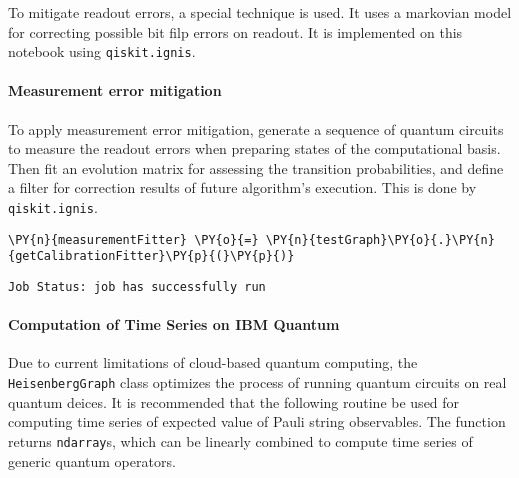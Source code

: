 To mitigate readout errors, a special technique is used. It uses a
markovian model for correcting possible bit filp errors on readout. It
is implemented on this notebook using \texttt{qiskit.ignis}.

    \hypertarget{measurement-error-mitigation}{%
\paragraph{Measurement error
mitigation}\label{measurement-error-mitigation}}

To apply measurement error mitigation, generate a sequence of quantum
circuits to measure the readout errors when preparing states of the
computational basis. Then fit an evolution matrix for assessing the
transition probabilities, and define a filter for correction results of
future algorithm's execution. This is done by \texttt{qiskit.ignis}.

    \begin{tcolorbox}[breakable, size=fbox, boxrule=1pt, pad at break*=1mm,colback=cellbackground, colframe=cellborder]
\begin{Verbatim}[commandchars=\\\{\}]
\PY{n}{measurementFitter} \PY{o}{=} \PY{n}{testGraph}\PY{o}{.}\PY{n}{getCalibrationFitter}\PY{p}{(}\PY{p}{)}
\end{Verbatim}
\end{tcolorbox}

    \begin{Verbatim}[commandchars=\\\{\}]
Job Status: job has successfully run
    \end{Verbatim}

    \hypertarget{computation-of-time-series-on-ibm-quantum}{%
\paragraph{Computation of Time Series on IBM
Quantum}\label{computation-of-time-series-on-ibm-quantum}}

Due to current limitations of cloud-based quantum computing, the
\texttt{HeisenbergGraph} class optimizes the process of running quantum
circuits on real quantum deices. It is recommended that the following
routine be used for computing time series of expected value of Pauli
string observables. The function returns \texttt{ndarray}s, which can be
linearly combined to compute time series of generic quantum operators.

